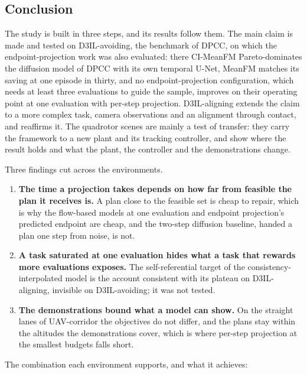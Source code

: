 \subsection{Conclusion}\label{sec:res:summary:conclusion}

The study is built in three steps, and its results follow them. The main claim is made and tested on
D3IL-avoiding, the benchmark of \ac{DPCC}, on which the endpoint-projection work was also evaluated: there
CI-MeanFM Pareto-dominates the diffusion model of \ac{DPCC} with its own temporal U-Net, MeanFM matches its
saving at one episode in thirty, and no
endpoint-projection configuration, which needs at least three evaluations to guide the sample, improves on their
operating point at one evaluation with per-step projection. D3IL-aligning extends the claim to a more complex
task, camera observations and an alignment through contact, and reaffirms it. The quadrotor scenes are mainly a
test of transfer: they carry the framework to a new plant and its tracking controller, and show where the result
holds and what the plant, the controller and the demonstrations change.

Three findings cut across the environments.

\begin{enumerate}
  \item \textbf{The time a projection takes depends on how far from feasible the plan it receives is.} A plan close to the
    feasible set is cheap to repair, which is why the flow-based models at one evaluation and endpoint
    projection's predicted endpoint are cheap, and the two-step diffusion baseline, handed a plan one step
    from noise, is not.
  \item \textbf{A task saturated at one evaluation hides what a task that rewards more evaluations exposes.}
    The self-referential target of the consistency-interpolated model is the account consistent with its
    plateau on D3IL-aligning, invisible on D3IL-avoiding; it was not tested.
  \item \textbf{The demonstrations bound what a model can show.} On the straight lanes of UAV-corridor the
    objectives do not differ, and the plans stay within the altitudes the demonstrations cover, which is
    where per-step projection at the smallest budgets falls short.
\end{enumerate}

The combination each environment supports, and what it achieves:

